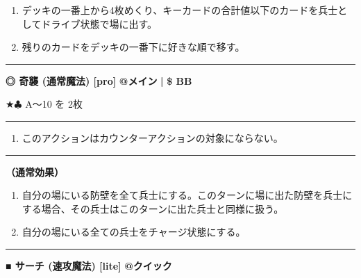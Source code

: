 \documentclass[twocolumn,a5paper,papersize,10pt]{jarticle}
\begin{document}
\vspace{-1zh}%
\begin{enumerate}
\setlength{\leftskip}{-0.3cm}
\setlength{\parskip}{0pt} %

\item デッキの一番上から4枚めくり、キーカードの合計値以下のカードを兵士としてドライブ状態で場に出す。

\item 残りのカードをデッキの一番下に好きな順で移す。
\vspace{-1zh}%
\end{enumerate}
\vspace{2mm} %
\hrule height 0.5mm depth 0mm width 66.5mm %
\vspace{1mm} %
{\normalsize\bf ◎ 奇襲 {\scriptsize (通常魔法) [pro]}} %
\hfill 
{\small\bf @メイン }
  {\small\bf | } {\small\bf \$ BB}

★{\normalsize $\clubsuit$} A〜10 を 2枚

\vspace{1mm}%
\hrule height 0.1mm depth 0mm width 66.5mm %
\vspace{1mm}%


\vspace{-1zh}%
\begin{enumerate}
\renewcommand{\labelenumi}{※}
\setlength{\leftskip}{-0.3cm}
\setlength{\itemsep}{0pt} %
\setlength{\parskip}{0pt} %

\item このアクションはカウンターアクションの対象にならない。

\vspace{-3mm}%
\end{enumerate}
\vspace{1mm}%
\hrule height 0.1mm depth 0mm width 66.5mm %
\vspace{1mm}%

{\bf（通常効果）}


\vspace{-1zh}%
\begin{enumerate}
\setlength{\leftskip}{-0.3cm}
\setlength{\parskip}{0pt} %

\item 自分の場にいる防壁を全て兵士にする。このターンに場に出た防壁を兵士にする場合、その兵士はこのターンに出た兵士と同様に扱う。

\item 自分の場にいる全ての兵士をチャージ状態にする。
\vspace{-1zh}%
\end{enumerate}
\vspace{2mm} %
\hrule height 0.5mm depth 0mm width 66.5mm %
\vspace{1mm} %
{\normalsize\bf ■ サーチ {\scriptsize (速攻魔法) [lite]}} %
\hfill 
{\small\bf @クイック }
\end{document}
